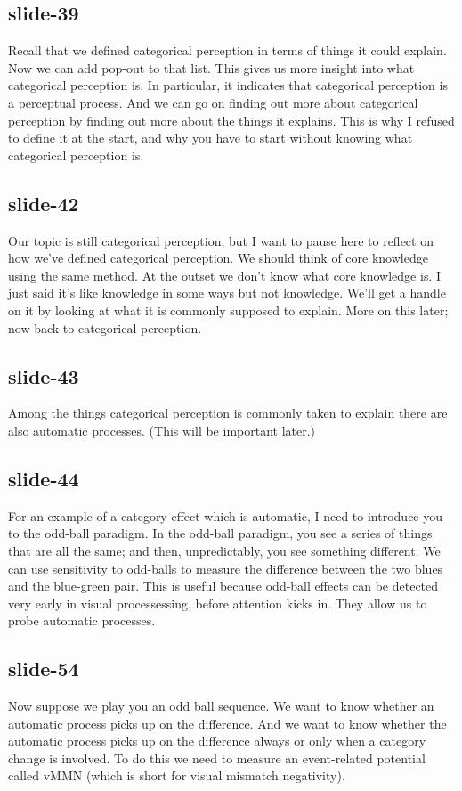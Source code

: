 \documentclass[12pt,\papersize]{extarticle}
\begin{document}
 
\subsection{slide-39}
Recall that we defined categorical perception in terms of things it could explain.
Now we can add pop-out to that list.
This gives us more insight into what categorical perception is.
In particular, it indicates that categorical perception is a perceptual process.
And we can go on finding out more about categorical perception by finding out more about the things it explains.
This is why I refused to define it at the start, and why you have to start without knowing what categorical perception is.
 
 
\subsection{slide-42}
Our topic is still categorical perception, but I want to pause here to reflect on how we've defined categorical perception.
We should think of core knowledge using the same method.
At the outset we don't know what core knowledge is.
I just said it's like knowledge in some ways but not knowledge.
We'll get a handle on it by looking at what it is commonly supposed to explain.
More on this later; now back to categorical perception.
 
 
\subsection{slide-43}
Among the things categorical perception is commonly taken to explain there are also automatic processes.
(This will be important later.)
 
 
\subsection{slide-44}
For an example of a category effect which is automatic, I need to introduce you to the odd-ball paradigm.
In the odd-ball paradigm, you see a series of things that are all the same; and then, unpredictably, you see something different.
We can use sensitivity to odd-balls to measure the difference between the two blues and the blue-green pair.
This is useful because odd-ball effects can be detected very early in visual processessing, before attention kicks in.
They allow us to probe automatic processes.
 
 
\subsection{slide-54}
Now suppose we play you an odd ball sequence.
We want to know whether an automatic process picks up on the difference.
And we want to know whether the automatic process picks up on the difference always or only when a category change is involved.
To do this we need to measure an event-related potential called vMMN (which is short for visual mismatch negativity).
 
\end{document}
